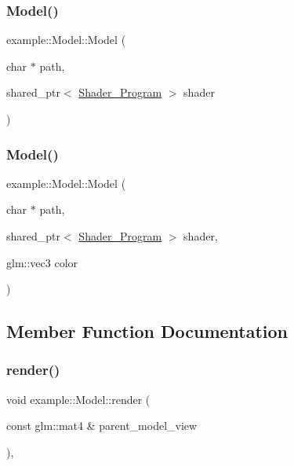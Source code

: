 \subsubsection{\texorpdfstring{Model()}{Model()}\hspace{0.1cm}{\footnotesize\ttfamily [1/2]}}
{\footnotesize\ttfamily example\+::\+Model\+::\+Model (\begin{DoxyParamCaption}\item[{char $\ast$}]{path,  }\item[{shared\+\_\+ptr$<$ \mbox{\hyperlink{classexample_1_1_shader___program}{Shader\+\_\+\+Program}} $>$}]{shader }\end{DoxyParamCaption})\hspace{0.3cm}{\ttfamily [inline]}}

\mbox{\label{classexample_1_1_model_a2a701d4681196c9c0312743b1acac645}} 
\subsubsection{\texorpdfstring{Model()}{Model()}\hspace{0.1cm}{\footnotesize\ttfamily [2/2]}}
{\footnotesize\ttfamily example\+::\+Model\+::\+Model (\begin{DoxyParamCaption}\item[{char $\ast$}]{path,  }\item[{shared\+\_\+ptr$<$ \mbox{\hyperlink{classexample_1_1_shader___program}{Shader\+\_\+\+Program}} $>$}]{shader,  }\item[{glm\+::vec3}]{color }\end{DoxyParamCaption})\hspace{0.3cm}{\ttfamily [inline]}}



\subsection{Member Function Documentation}
\mbox{\label{classexample_1_1_model_ab280b30836095117f49acc5dfa92daf9}} 
\subsubsection{\texorpdfstring{render()}{render()}}
{\footnotesize\ttfamily void example\+::\+Model\+::render (\begin{DoxyParamCaption}\item[{const glm\+::mat4 \&}]{parent\+\_\+model\+\_\+view }\end{DoxyParamCaption})\hspace{0.3cm}{\ttfamily [override]}, {\ttfamily [virtual]}}



